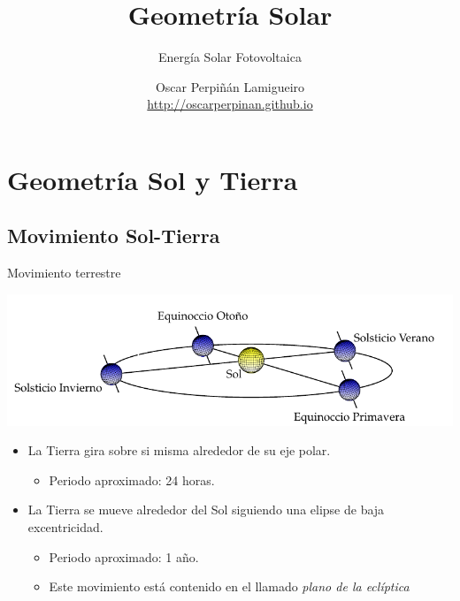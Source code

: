 \documentclass[xcolor={usenames,svgnames,dvipsnames}]{beamer}
\author{Oscar Perpiñán Lamigueiro \\ \url{http://oscarperpinan.github.io}}
\date{}
\title{Geometría Solar}
\subtitle{Energía Solar Fotovoltaica}
\begin{document}
\maketitle

\section{Geometría Sol y Tierra}
\label{sec:org570cee7}
\subsection{Movimiento Sol-Tierra}
\label{sec:orgfb4c5bf}

\begin{frame}[label={sec:orgab925d0}]{Movimiento terrestre}
\begin{center}
\includegraphics[width=.9\linewidth]{../figs/PlanoEcliptica.pdf}
\end{center}

\begin{itemize}[<+->]
\item La Tierra \alert{gira sobre si misma} alrededor de su eje polar.
\begin{itemize}[<.->]
\item Periodo aproximado: 24 horas.
\end{itemize}

\item La Tierra se mueve \alert{alrededor del Sol} siguiendo una elipse de baja
excentricidad.
\begin{itemize}[<.->]
\item Periodo aproximado: 1 año.

\item Este movimiento está contenido en el llamado \emph{plano de la
eclíptica}
\end{itemize}
\end{itemize}
\end{frame}
\end{document}
